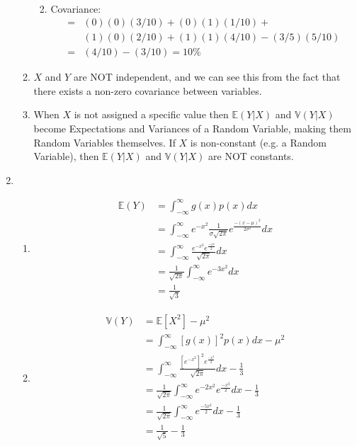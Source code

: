 \documentclass[11pt,a4paper]{article}
\begin{document}
\begin{enumerate}
\begin{enumerate}
\begin{enumerate}
\begin{align*}
					\end{align*}
					\item Covariance:
					\begin{align*}
					= &(0)(0)(3/10) + (0)(1)(1/10) + \\
					  &(1)(0)(2/10) + (1)(1)(4/10) - (3/5)(5/10) \\
					= &(4/10)-(3/10) = 10\%
					\end{align*}
				\end{enumerate}
				\item $X$ and $Y$ are NOT independent, and we can see this from the fact that there exists a non-zero covariance between variables.
				\item When $X$ is not assigned a specific value then $\mathbb{E}(Y|X)$ and $\mathbb{V}(Y|X)$ become Expectations and Variances of a Random Variable, making them Random Variables themselves. If $X$ is non-constant (e.g. a Random Variable), then $\mathbb{E}(Y|X)$ and $\mathbb{V}(Y|X)$ are NOT constants.
			\end{enumerate}
			\item
				\begin{enumerate}
					\item
					\begin{align*}
					\mathbb{E}(Y) &= \int_{-\infty}^{\infty} g(x)p(x)dx \\
					&= \int_{-\infty}^{\infty} e^{-x^2}\frac{1}{\sigma\sqrt{2\pi}}e^{\frac{-(x-\mu)^2}{2\sigma^2}}dx \\
					&= \int_{-\infty}^{\infty} \frac{e^{-x^2}e^{\frac{-x^2}{2}}}{\sqrt{2\pi}}dx \\
					&= \frac{1}{\sqrt{2\pi}}\int_{-\infty}^{\infty} e^{-3x^2}dx \\
					&= \frac{1}{\sqrt{3}}
					\end{align*}
					\item
					\begin{align*}
					\mathbb{V}(Y) &= \mathbb{E}[X^2]-\mu^2 \\
					&= \int_{-\infty}^{\infty} [g(x)]^2p(x)dx - \mu^2 \\
					&= \int_{-\infty}^{\infty} \frac{ [e^{-x^2}]^2 e^{\frac{-x^2}{2}} }{\sqrt{2\pi} }dx - \frac{1}{3} \\
					&= \frac{1}{\sqrt{2\pi}}\int_{-\infty}^{\infty} e^{-2x^2} e^{\frac{-x^2}{2}}dx - \frac{1}{3} \\
					&= \frac{1}{\sqrt{2\pi}}\int_{-\infty}^{\infty} e^{\frac{-5x^2}{2}}dx - \frac{1}{3} \\
					&= \frac{1}{\sqrt{5}} - \frac{1}{3} \\

\end{align*}
\end{enumerate}
\end{enumerate}
\end{document}
